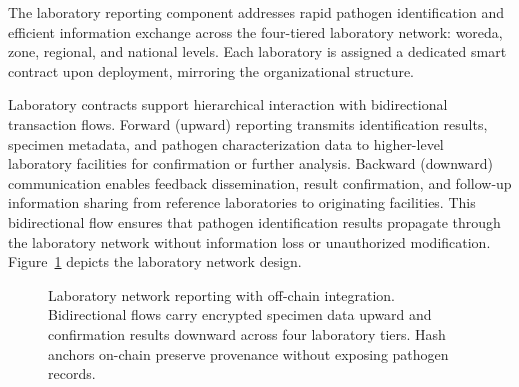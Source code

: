 \documentclass[AMA,LATO1COL]{WileyNJD-v2}
\begin{document}
The laboratory reporting component addresses rapid pathogen identification and efficient information exchange across the four-tiered laboratory network: woreda, zone, regional, and national levels. Each laboratory is assigned a dedicated smart contract upon deployment, mirroring the organizational structure.

Laboratory contracts support hierarchical interaction with bidirectional transaction flows. Forward (upward) reporting transmits identification results, specimen metadata, and pathogen characterization data to higher-level laboratory facilities for confirmation or further analysis. Backward (downward) communication enables feedback dissemination, result confirmation, and follow-up information sharing from reference laboratories to originating facilities. This bidirectional flow ensures that pathogen identification results propagate through the laboratory network without information loss or unauthorized modification. Figure~\ref{fig:laboratory} depicts the laboratory network design.

\begin{figure}[!ht]
\centering
{}
\caption{Laboratory network reporting with off-chain integration. Bidirectional flows carry encrypted specimen data upward and confirmation results downward across four laboratory tiers. Hash anchors on-chain preserve provenance without exposing pathogen records.}\label{fig:laboratory}
\end{figure}
%
%
%
%
%
%
\end{document}
